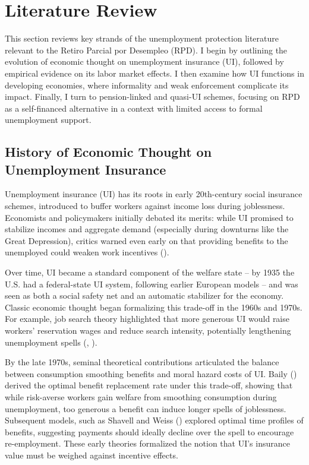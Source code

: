 \documentclass[
  4pt,
]{report}
\begin{document}
\chapter{Literature Review}\label{sec-lit-review}

This section reviews key strands of the unemployment protection
literature relevant to the Retiro Parcial por Desempleo (RPD). I begin
by outlining the evolution of economic thought on unemployment insurance
(UI), followed by empirical evidence on its labor market effects. I then
examine how UI functions in developing economies, where informality and
weak enforcement complicate its impact. Finally, I turn to
pension-linked and quasi-UI schemes, focusing on RPD as a self-financed
alternative in a context with limited access to formal unemployment
support.

\section{History of Economic Thought on Unemployment
Insurance}\label{history-of-economic-thought-on-unemployment-insurance}

Unemployment insurance (UI) has its roots in early 20th-century social
insurance schemes, introduced to buffer workers against income loss
during joblessness. Economists and policymakers initially debated its
merits: while UI promised to stabilize incomes and aggregate demand
(especially during downturns like the Great Depression), critics warned
even early on that providing benefits to the unemployed could weaken
work incentives ().

Over time, UI became a standard component of the welfare state -- by
1935 the U.S. had a federal-state UI system, following earlier European
models -- and was seen as both a social safety net and an automatic
stabilizer for the economy. Classic economic thought began formalizing
this trade-off in the 1960s and 1970s. For example, job search theory
highlighted that more generous UI would raise workers' reservation wages
and reduce search intensity, potentially lengthening unemployment spells
(,
).

By the late 1970s, seminal theoretical contributions articulated the
balance between consumption smoothing benefits and moral hazard costs of
UI. Baily () derived the optimal benefit
replacement rate under this trade-off, showing that while risk-averse
workers gain welfare from smoothing consumption during unemployment, too
generous a benefit can induce longer spells of joblessness. Subsequent
models, such as Shavell and Weiss ()
explored optimal time profiles of benefits, suggesting payments should
ideally decline over the spell to encourage re-employment. These early
theories formalized the notion that UI's insurance value must be weighed
against incentive effects.
\end{document}
